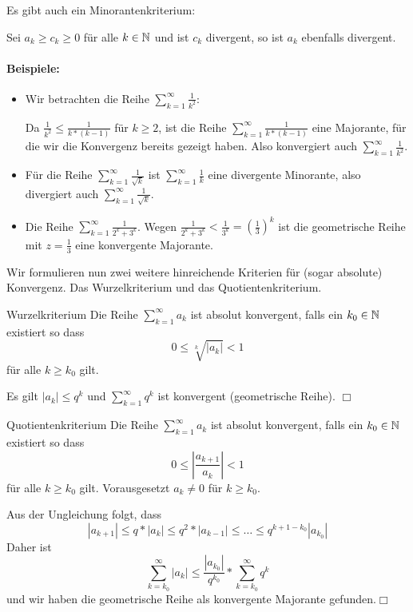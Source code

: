 \par\bigskip
Es gibt auch ein Minorantenkriterium:

Sei $a_k\geq c_k\geq 0$ für alle $k\in\mathbb{N}$ und ist $c_k$ divergent, so ist $a_k$ ebenfalls divergent.

\paragraph{Beispiele:}
\begin{itemize}
	\item Wir betrachten die Reihe $\sum_{k=1}^\infty \frac1{k^2}$:

	Da $\frac1{k^2}\leq\frac{1}{k*(k-1)}$ für $k\geq 2$, ist die Reihe $\sum_{k=1}^\infty \frac{1}{k*(k-1)}$ eine Majorante, für die wir die Konvergenz bereits gezeigt haben. Also konvergiert auch $\sum_{k=1}^\infty \frac1{k^2}$.

	\item Für die Reihe $\sum_{k=1}^\infty \frac{1}{\sqrt k}$ ist $\sum_{k=1}^\infty \frac{1}{k}$ eine divergente Minorante, also divergiert auch $\sum_{k=1}^\infty \frac{1}{\sqrt k}$.

	\item Die Reihe $\sum_{k=1}^\infty \frac{1}{2^k+3^k}$. Wegen $\frac{1}{2^k+3^k}<\frac{1}{3^k}=\left(\frac13\right)^k$ ist die geometrische Reihe mit $z=\frac13$ eine konvergente Majorante.
\end{itemize}

Wir formulieren nun zwei weitere hinreichende Kriterien für (sogar absolute) Konvergenz. Das Wurzelkriterium und das Quotientenkriterium.

\begin{satz}{Wurzelkriterium}
	Die Reihe $\sum_{k=1}^\infty a_k$ ist absolut konvergent, falls ein $k_0\in\mathbb{N}$ existiert so dass
	\begin{equation*}
		0\leq\sqrt[k]{|a_k|}<1
	\end{equation*}
	für alle $k\geq k_0$ gilt.
\end{satz}
\beweis
Es gilt $|a_k|\leq q^k$ und $\sum_{k=1}^\infty q^k$ ist konvergent (geometrische Reihe). \hfill $\Box$


\begin{satz}{Quotientenkriterium}
	Die Reihe $\sum_{k=1}^\infty a_k$ ist absolut konvergent, falls ein $k_0\in\mathbb{N}$ existiert so dass
	\begin{equation*}
		0\leq\left|\frac{a_{k+1}}{a_k}\right|<1
	\end{equation*}
	für alle $k\geq k_0$ gilt. Vorausgesetzt $a_k\neq 0$ für $k\geq k_0$.
\end{satz}
\beweis
Aus der Ungleichung folgt, dass
\begin{equation*}
	|a_{k+1}|\leq q*|a_k|\leq q^2*|a_{k-1}|\leq \ldots \leq q^{k+1-k_0}|a_{k_0}|
\end{equation*}
Daher ist
\begin{equation*}
	\sum_{k=k_0}^\infty |a_k|\leq \frac{|a_{k_0}|}{q^{k_0}}* \sum_{k=k_0}^\infty q^k
\end{equation*}
und wir haben die geometrische Reihe als konvergente Majorante gefunden.\hfill$\Box$

